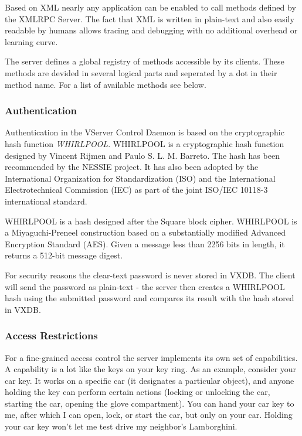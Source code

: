 Based on XML nearly any application can be enabled to call methods defined by
the XMLRPC Server. The fact that XML is written in plain-text and also easily
readable by humans allows tracing and debugging with no additional overhead or
learning curve.

The server defines a global registry of methods accessible by its clients.
These methods are devided in several logical parts and seperated by a dot in
their method name. For a list of available methods see below.


\subsubsection{Authentication}

Authentication in the VServer Control Daemon is based on the cryptographic hash
function \emph{WHIRLPOOL}. WHIRLPOOL is a cryptographic hash function designed
by Vincent Rijmen and Paulo S. L. M. Barreto. The hash has been recommended by
the NESSIE project.  It has also been adopted by the International Organization
for Standardization (ISO) and the International Electrotechnical Commission
(IEC) as part of the joint ISO/IEC 10118-3 international standard.

WHIRLPOOL is a hash designed after the Square block cipher. WHIRLPOOL is a
Miyaguchi-Preneel construction based on a substantially modified Advanced
Encryption Standard (AES).  Given a message less than 2256 bits in length, it
returns a 512-bit message digest.

For security reasons the clear-text password is never stored in VXDB. The
client will send the password as plain-text - the server then creates a
WHIRLPOOL hash using the submitted password and compares its result with the
hash stored in VXDB.


\subsubsection{Access Restrictions}

For a fine-grained access control the server implements its own set of
capabilities.  A capability is a lot like the keys on your key ring. As an
example, consider your car key. It works on a specific car (it designates a
particular object), and anyone holding the key can perform certain actions
(locking or unlocking the car, starting the car, opening the glove
compartment). You can hand your car key to me, after which I can open, lock, or
start the car, but only on your car. Holding your car key won't let me test
drive my neighbor's Lamborghini.


